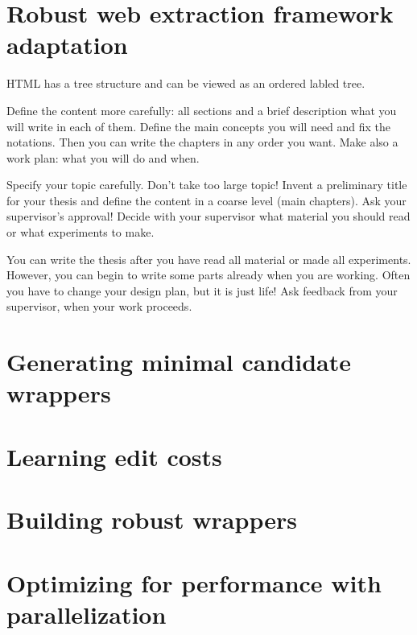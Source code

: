 \chapter{Robust web extraction framework adaptation}

HTML has a tree structure and can be viewed as an ordered labled tree.

Define the content more carefully: all sections and a brief description what you will write in each of them. Define the main concepts you will need and fix the notations. Then you can write the chapters in any order you want. Make also a work plan: what you will do and when.

Specify your topic carefully. Don’t take too large topic!  Invent a preliminary title for your thesis and define the content in a coarse level (main chapters). Ask your supervisor’s approval! Decide with your supervisor what material you should read or what experiments to make.  

You can write the thesis after you have read all material or made all experiments. However, you can begin to write some parts already when you are working. Often you have to change your design plan, but it is just life! Ask feedback from your supervisor, when your work proceeds.

\chapter{Generating minimal candidate wrappers}
\chapter{Learning edit costs}
\chapter{Building robust wrappers}
\chapter{Optimizing for performance with parallelization}



